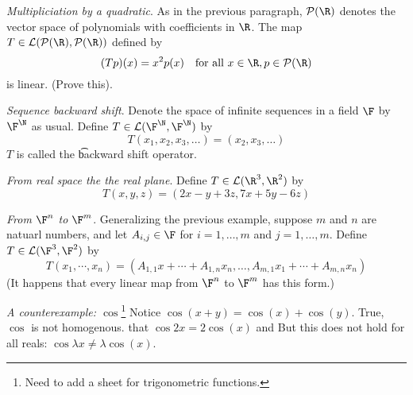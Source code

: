 \textit{Multipliciation by a quadratic}.
As in the previous paragraph, $\mathcal{P} (\R )$ denotes the vector space of polynomials with coefficients in $\R $.
The map $T \in \mathcal{L} (\mathcal{P} (\R ), \mathcal{P} (\R ))$ defined by
\[
(Tp)(x) = x^2p(x) \quad \text{for all } x \in \R , p \in \mathcal{P} (\R )
\]
is linear.
(Prove this).

\textit{Sequence backward shift}.
Denote the space of infinite sequences in a field $\F $ by $\F ^\N  $ as usual.
Define $T \in \mathcal{L} (\F ^\N  , \F ^\N  )$ by
\[
T(x_1, x_2, x_3, \dots ) = (x_2, x_3, \dots )
\]
$T$ is called the \t{backward shift operator}.

\textit{From real space the the real plane}.
Define $T \in \mathcal{L} (\R ^3, \R ^2)$ by
\[
T(x, y, z) = (2x - y + 3z, 7x+5y - 6z)
\]

\textit{From $\F ^n$ to $\F ^m$}.
Generalizing the previous example, suppose $m$ and $n$ are natuarl numbers, and let $A_{i, j} \in \F $ for $i = 1, \dots , m$ and $j = 1, \dots , m$.
Define $T \in \mathcal{L} (\F ^3, \F ^2)$ by
\[
T(x_1, \cdots, x_n) = (A_{1,1}x + \cdots + A_{1,n} x_n, \dots , A_{m,1}x_1 + \cdots + A_{m,n}x_n)
\]
(It happens that every linear map from $\F ^n$ to $\F ^m$ has this form.)

\textit{A counterexample: $\cos$}\footnote{Need to add a sheet for trigonometric functions.}
Notice $\cos(x + y) = \cos(x) + \cos(y)$.
True, $\cos$ is not homogenous. that $\cos2x = 2\cos(x)$ and
But this does not hold for all reals: $\cos \lambda x \neq \lambda \cos(x)$.

\blankpage